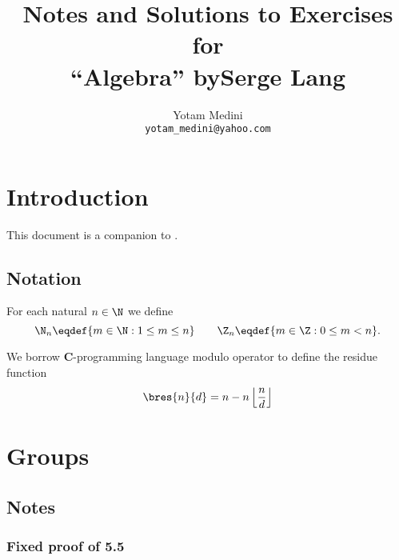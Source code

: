 \documentclass[12pt]{book}
\title{
 Notes and Solutions to Exercises\\
 for\\
 ``Algebra'' \quad by\quad  Serge Lang}
\author{Yotam Medini\\\texttt{yotam\_medini@yahoo.com}}
\begin{document}
\maketitle
\newpage
\tableofcontents
\newpage

\chapter*{Introduction}

This document is a companion to \cite{Lan94}.

\section*{Notation}

For each natural \(n\in\N\) we define
\begin{equation*}
\N_n \eqdef \{m\in\N: 1\leq m \leq n\} \qquad
\Z_n \eqdef \{m\in\Z: 0\leq m < n\}.
\end{equation*}

We borrow \textbf{C}-programming language modulo operator
to define the residue function
\begin{equation*}
\bres{n}{d} = n - n \left\lfloor \frac{n}{d} \right\rfloor
\end{equation*}


\chapter{Groups}

\section{Notes}

\subsection{Fixed proof of 5.5}
\end{document}
